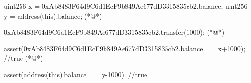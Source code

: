 \begin{soliditybox}
uint256 x = 0xAb8483F64d9C6d1EcF9b849Ae677dD3315835cb2.balance;
uint256 y = address(this).balance; (*@\pause@*)

0xAb8483F64d9C6d1EcF9b849Ae677dD3315835cb2.transfer(1000); (*@\pause@*)

assert(0xAb8483F64d9C6d1EcF9b849Ae677dD3315835cb2.balance == x+1000);
//true  (*@\pause@*)

assert(address(this).balance == y-1000); //true
\end{soliditybox}